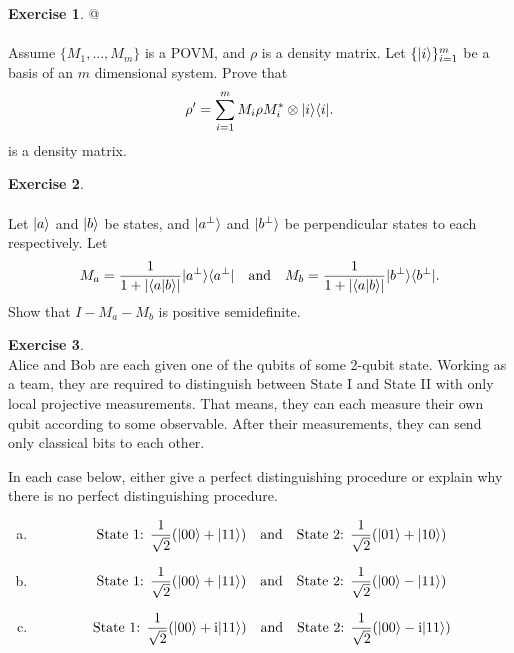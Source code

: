 \documentclass[12pt]{article}
\theoremstyle{plain}
\theoremstyle{definition}
\newtheorem{exerc}{Exercise}
\begin{document}
\noindent \hrulefill

\begin{exerc}@ \\ \ \\
  Assume $\{M_1,...,M_m\}$ is a POVM, and $\rho$ is a density matrix. Let $\{|i\rangle\}_{i = 1}^m$ be a basis of an $m$ dimensional system. Prove that
  \[
  	\rho' = \sum_{i = 1}^m M_i \rho M_i^* \otimes | i \rangle \langle i |.
  \]
  is a density matrix.
\end{exerc}

\noindent \hrulefill

\begin{exerc} \ \\ \ \\
	Let $|a\rangle$ and $|b\rangle$ be states, and $|a^\perp\rangle$ and $|b^\perp\rangle$ be perpendicular states to each respectively. Let
	\[
		M_a = \frac{1}{1+|\langle a |b \rangle|} | a^\perp \rangle \langle a^\perp | \quad \text{and}\quad M_b = \frac{1}{1+|\langle a |b \rangle|} | b^\perp \rangle \langle b^\perp |.
	\]
	Show that $I - M_a - M_b$ is positive semidefinite.
\end{exerc}

\noindent \hrulefill

\begin{exerc}\ \\
Alice and Bob are each given one of the qubits of some 2-qubit state. Working as a team, they are required to distinguish between State I and State II with only local projective measurements. That means, they can each measure their own qubit according to some observable. After their measurements, they can send only classical bits to each other.

In each case below, either give a perfect distinguishing procedure or explain why there is no perfect distinguishing procedure.

\begin{enumerate}[(a)]
	\item \[\text{State 1: }\frac{1}{\sqrt{2}} (|00\rangle + |11\rangle) \quad \text{and} \quad \text{State 2: } \frac{1}{\sqrt{2}} (|01\rangle + |10\rangle) \]
	\item \[\text{State 1: }\frac{1}{\sqrt{2}} (|00\rangle + |11\rangle) \quad \text{and} \quad \text{State 2: } \frac{1}{\sqrt{2}} (|00\rangle - |11\rangle) \]
	\item \[\text{State 1: }\frac{1}{\sqrt{2}} (|00\rangle + \mathrm{i} |11\rangle) \quad \text{and} \quad \text{State 2: } \frac{1}{\sqrt{2}} (|00\rangle - \mathrm{i} |11\rangle) \]
\end{enumerate}

\end{exerc}
\end{document}
